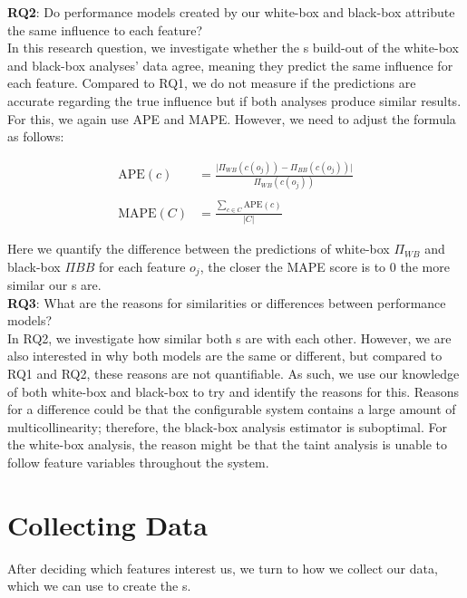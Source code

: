 \noindent \textbf{RQ2}: Do performance models created by our white-box and black-box attribute the same influence to each feature?\\

In this research question, we investigate whether the {\perfInfluenceModel}s build-out of the white-box and black-box analyses' data agree, 
meaning they predict the same influence for each feature. 
Compared to RQ1, we do not measure if the predictions are accurate regarding the true influence but if both analyses produce similar results. 
For this, we again use APE and MAPE. However, we need to adjust the formula as follows:

\begin{align}
    \text{APE}(c) &= \frac{\lvert\Pi_{WB}(c(o_j)) - \Pi_{BB}(c(o_j))\rvert}{\Pi_{WB}(c(o_j))} \label{equ:APE} \\ \nonumber \\
    \text{MAPE}(C) &= \frac{\sum_{c \in C} \text{APE}(c)}{\lvert C \rvert} \label{equ:mape}
\end{align}

Here we quantify the difference between the predictions of white-box $\Pi_{WB}$ and black-box $\Pi{BB}$ for each feature $o_j$, 
the closer the MAPE score is to $0$ the more similar our {\perfInfluenceModel}s are.\\

\noindent \textbf{RQ3}: What are the reasons for similarities or differences between performance models?\\

In RQ2, we investigate how similar both {\perfInfluenceModel}s are with each other. 
However, we are also interested in why both models are the same or different, but compared to RQ1 and RQ2, these reasons are not quantifiable. 
As such, we use our knowledge of both white-box and black-box to try and identify the reasons for this. Reasons for a difference could be 
that the configurable system contains a large amount of multicollinearity; therefore, the black-box analysis estimator is suboptimal. 
For the white-box analysis, the reason might be that the taint analysis is unable to follow feature variables throughout the system.

\section{Collecting Data}\label{ch:collect-data}
After deciding which features interest us, we turn to how we collect our data, which we can use to create the {\perfInfluenceModel}s.

